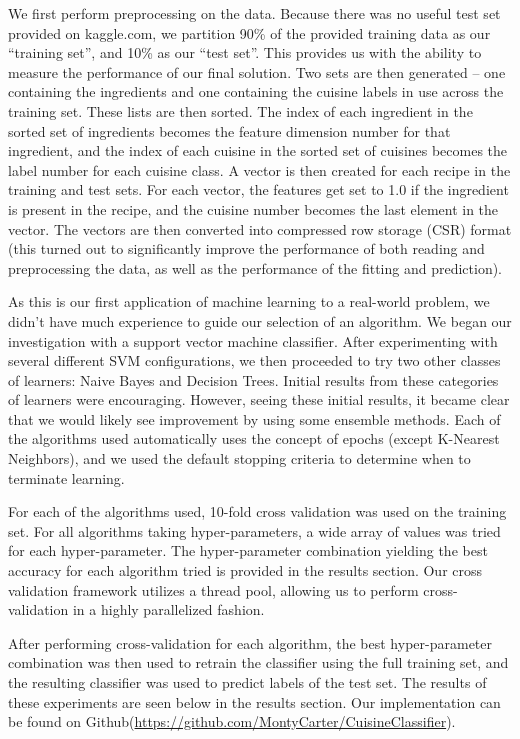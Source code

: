 \documentclass[11pt]{article}
\begin{document}
We first perform preprocessing on the data.  Because there was no
useful test set provided on kaggle.com, we partition 90\% of the
provided training data as our ``training set'', and 10\% as our ``test
set''. This provides us with the ability to measure the performance of
our final solution.  Two sets are then generated -- one containing the
ingredients and one containing the cuisine labels in use across the
training set.  These lists are then sorted.  The index of each
ingredient in the sorted set of ingredients becomes the feature 
dimension number for that ingredient, and the index of each cuisine in
the sorted set of cuisines becomes the label number for each cuisine
class.  A vector is then created for each recipe in the training and
test sets.  For each vector, the features get set to 1.0 if the
ingredient is present in the recipe, and the cuisine number becomes
the last element in the vector.  The vectors are then converted into
compressed row storage (CSR) format (this turned out to significantly
improve the performance of both reading and preprocessing the data, as 
well as the performance of the fitting and prediction).

As this is our first application of machine learning to a real-world
problem, we didn't have much experience to guide our selection of an
algorithm.  We began our investigation with a support vector machine
classifier.  After experimenting with several different SVM
configurations, we then proceeded to try two other classes of
learners: Naive Bayes and Decision Trees.  Initial results from these
categories of learners were encouraging.  However, seeing these
initial results, it became clear that we would likely see improvement
by using some ensemble methods.  Each of the algorithms used
automatically uses the concept of epochs (except K-Nearest Neighbors),
and we used the default stopping criteria to determine when to
terminate learning.  

For each of the algorithms used, 10-fold cross validation was used on
the training set.  For all algorithms taking hyper-parameters, a wide
array of values was tried for each hyper-parameter.  The
hyper-parameter combination yielding the best accuracy for each
algorithm tried is provided in the results section.  Our cross
validation framework utilizes a thread pool, allowing us to perform
cross-validation in a highly parallelized fashion.

After performing cross-validation for each algorithm, the best
hyper-parameter combination was then used to retrain the classifier
using the full training set, and the resulting classifier was used
to predict labels of the test set.  The results of these experiments
are seen below in the results section. Our implementation can be found
on Github(\url{https://github.com/MontyCarter/CuisineClassifier}).
\end{document}
